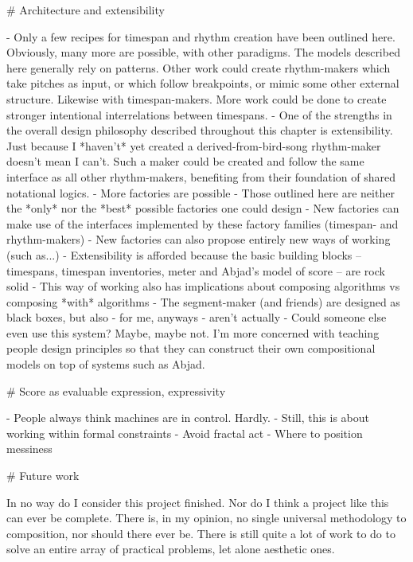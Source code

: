 \begin{markdown}
# Architecture and extensibility

-   Only a few recipes for timespan and rhythm creation have been outlined
    here. Obviously, many more are possible, with other paradigms. The models
    described here generally rely on patterns. Other work could create
    rhythm-makers which take pitches as input, or which follow breakpoints, or
    mimic some other external structure. Likewise with timespan-makers. More
    work could be done to create stronger intentional interrelations between
    timespans.
-   One of the strengths in the overall design philosophy described throughout
    this chapter is extensibility. Just because I *haven't* yet created a
    derived-from-bird-song rhythm-maker doesn't mean I can't. Such a maker
    could be created and follow the same interface as all other rhythm-makers,
    benefiting from their foundation of shared notational logics.
-   More factories are possible
-   Those outlined here are neither the *only* nor the *best* possible
    factories one could design
-   New factories can make use of the interfaces implemented by these
    factory families (timespan- and rhythm-makers)
-   New factories can also propose entirely new ways of working
    (such as...)
-   Extensibility is afforded because the basic building blocks --
    timespans, timespan inventories, meter and Abjad's model of score --
    are rock solid
-   This way of working also has implications about composing algorithms vs
    composing *with* algorithms
-   The segment-maker (and friends) are designed as black boxes, but also - for
    me, anyways - aren't actually
-   Could someone else even use this system? Maybe, maybe not. I'm more
    concerned with teaching people design principles so that they can construct
    their own compositional models on top of systems such as Abjad.

# Score as evaluable expression, expressivity

-   People always think machines are in control. Hardly.
-   Still, this is about working within formal constraints
-   Avoid fractal act
-   Where to position messiness

# Future work

In no way do I consider this project finished. Nor do I think a project like
this can ever be complete. There is, in my opinion, no single universal
methodology to composition, nor should there ever be. There is still quite a
lot of work to do to solve an entire array of practical problems, let alone
aesthetic ones.


\end{markdown}
